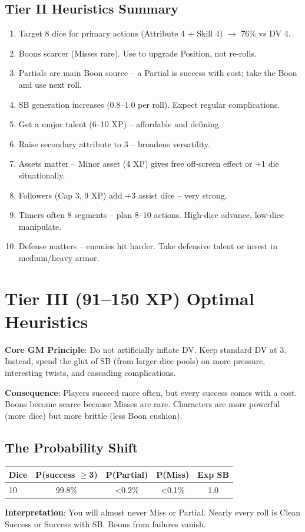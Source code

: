 \documentclass[11pt]{article}
\begin{document}
\subsection{Tier II Heuristics Summary}
\begin{enumerate}
    \item Target 8 dice for primary actions (Attribute 4 + Skill 4) $\rightarrow$ 76\% vs DV 4.
    \item Boons scarcer (Misses rare). Use to upgrade Position, not re-rolls.
    \item Partials are main Boon source -- a Partial is success with cost; take the Boon and use next roll.
    \item SB generation increases (0.8--1.0 per roll). Expect regular complications.
    \item Get a major talent (6--10 XP) -- affordable and defining.
    \item Raise secondary attribute to 3 -- broadens versatility.
    \item Assets matter -- Minor asset (4 XP) gives free off-screen effect or +1 die situationally.
    \item Followers (Cap 3, 9 XP) add +3 assist dice -- very strong.
    \item Timers often 8 segments -- plan 8--10 actions. High-dice advance, low-dice manipulate.
    \item Defense matters -- enemies hit harder. Take defensive talent or invest in medium/heavy armor.
\end{enumerate}

\section{Tier III (91--150 XP) Optimal Heuristics}

\textbf{Core GM Principle}: Do not artificially inflate DV. Keep standard DV at 3. Instead, spend the glut of SB (from larger dice pools) on more pressure, interesting twists, and cascading complications.

\textbf{Consequence}: Players succeed more often, but every success comes with a cost. Boons become scarce because Misses are rare. Characters are more powerful (more dice) but more brittle (less Boon cushion).

\subsection{The Probability Shift}
\begin{table}[h]
\centering
\begin{tabular}{lcccc}
\toprule
\textbf{Dice} & \textbf{P(success $\geq$3)} & \textbf{P(Partial)} & \textbf{P(Miss)} & \textbf{Exp SB} \\
\midrule
10 & 99.8\% & <0.2\% & <0.1\% & 1.0 \\
\bottomrule
\end{tabular}
\end{table}
\textbf{Interpretation}: You will almost never Miss or Partial. Nearly every roll is Clean Success or Success with SB. Boons from failures vanish.
\end{document}
